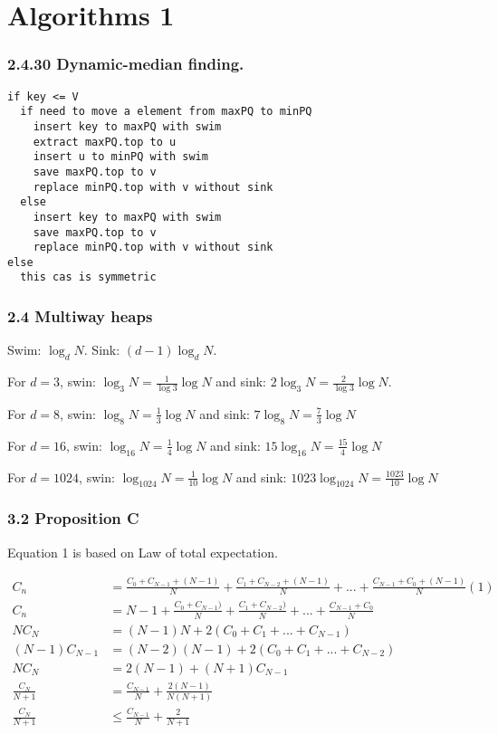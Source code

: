 \documentclass{book}
\begin{document}
\part{Algorithms 1}

\section*{2.4.30 Dynamic-median finding.}
\begin{verbatim}
if key <= V
  if need to move a element from maxPQ to minPQ
    insert key to maxPQ with swim
    extract maxPQ.top to u
    insert u to minPQ with swim
    save maxPQ.top to v
    replace minPQ.top with v without sink
  else
    insert key to maxPQ with swim
    save maxPQ.top to v
    replace minPQ.top with v without sink
else
  this cas is symmetric
\end{verbatim}

\section*{2.4 Multiway heaps}



Swim: $\log_{d}N$. Sink: $(d-1)\log_{d}N$.

For $d=3$, swin: $\log_{3}N = \frac{1}{\log3}\log N$ and sink:
$2\log_{3}N=\frac{2}{\log3}\log N$.

For $d=8$, swin: $\log_{8}N = \frac{1}{3}\log N$ and sink: $7\log_{8}N=\frac{7}{3}\log N$

For $d=16$, swin: $\log_{16}N = \frac{1}{4}\log N$ and sink:
$15\log_{16}N=\frac{15}{4}\log N$

For $d=1024$, swin: $\log_{1024}N = \frac{1}{10}\log N$ and sink:
$1023\log_{1024}N=\frac{1023}{10}\log N$

\section*{3.2 Proposition C}

Equation 1 is based on Law of total expectation.

\begin{align*}
C_n &= \frac{C_0 + C_{N-1}+(N -1)}{N} + \frac{C_1+C_{N-2} + (N-1)}{N} + ... +
\frac{C_{N-1}+C_0+(N-1)}{N} (1)\\
C_n &= N - 1 + \frac{C_0 + C_{N-1})}{N} + \frac{C_1+C_{N-2})}{N} + ... + \frac{C_{N-1}+C_0}{N} \\
NC_N &= (N - 1)N + 2(C_0+C_1+...+C_{N-1}) \\
(N-1)C_{N-1} &= (N-2)(N-1) + 2(C_0+C_1+...+C_{N-2}) \\
NC_N &=2(N-1) + (N+1)C_{N-1} \\
\frac{C_N}{N+1} &= \frac{C_{N-1}}{N} + \frac{2(N-1)}{N(N+1)} \\
\frac{C_N}{N+1} &\le \frac{C_{N-1}}{N} + \frac{2}{N+1}
\end{align*}
\end{document}
